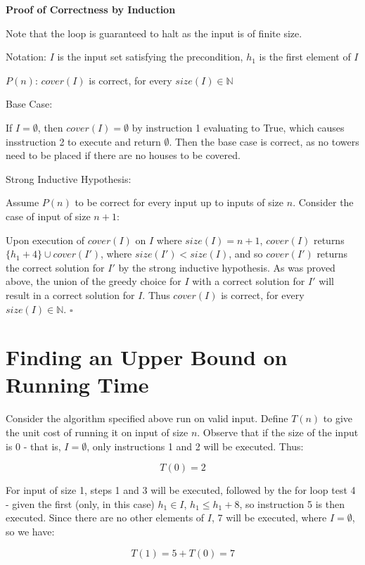 \documentclass{article}
\begin{document}
\textbf{Proof of Correctness by Induction}

Note that the loop is guaranteed to halt as the input is of finite size.

Notation: $I$ is the input set satisfying the precondition, $h_1$ is the first
element of $I$

$P(n)$: $cover(I)$ is correct, for every $size(I) \in \mathbb{N}$

Base Case:

If $I = \emptyset$, then $cover(I) = \emptyset$ by instruction 1 evaluating to
True, which causes insstruction 2 to execute and return $\emptyset$. Then the
base case is correct, as no towers need to be placed if there are no houses to
be covered.

Strong Inductive Hypothesis:

Assume $P(n)$ to be correct for every input up to inputs of size $n$. Consider
the case of input of size $n+1$:

Upon execution of $cover(I)$ on $I$ where $size(I) = n+1$, $cover(I)$ returns
$\{h_1+4\} \cup cover(I')$, where $size(I') < size(I)$, and so $cover(I')$
returns the correct solution for $I'$ by the strong inductive hypothesis. As
was proved above, the union of the greedy choice for $I$ with a correct
solution for $I'$ will result in a correct solution for $I$. Thus $cover(I)$ is
correct, for every $size(I) \in \mathbb{N}$. $\square$

\section{Finding an Upper Bound on Running Time}

Consider the algorithm specified above run on valid input. Define $T(n)$ to
give the unit cost of running it on input of size $n$. Observe that if the size
of the input is 0 - that is, $I = \emptyset$, only instructions 1 and 2 will be
executed. Thus:

\begin{equation*}
T(0) = 2
\end{equation*}

For input of size 1, steps 1 and 3 will be executed, followed by the for
loop test 4 - given the first (only, in this case) $h_1 \in I$, $h_1 \leq
h_1+8$, so instruction 5 is then executed. Since there are no other elements of
$I$, 7 will be executed, where $I = \emptyset$, so we have:

\begin{equation*}
T(1) = 5 + T(0) = 7
\end{equation*}
\end{document}
